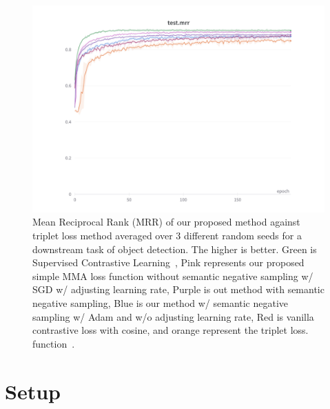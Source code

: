 \documentclass[sigconf,natbib=true,anonymous=true]{acmart}
\begin{document}
\begin{figure}[tbh]
\centering
\includegraphics[width=2.1\columnwidth]{Figures/test.mrr.pdf}
\caption{Mean Reciprocal Rank (MRR) of our proposed method against triplet loss method averaged over 3 different random seeds for a downstream task of object detection. The higher is better. Green is Supervised Contrastive Learning~\cite{NEURIPS2020_supervised_contrastive}, Pink represents our proposed simple MMA loss function without semantic negative sampling w/ SGD w/ adjusting learning rate, Purple is out method with semantic negative sampling, Blue is our method w/ semantic negative sampling w/ Adam and w/o adjusting learning rate, Red is vanilla contrastive loss with cosine, and orange represent the triplet loss. function~\cite{triplet_loss_2021_CVPR}.
}

\label{fig:simple-MMA-mrr}
\end{figure}

\section{Setup}

% 
\end{document}
